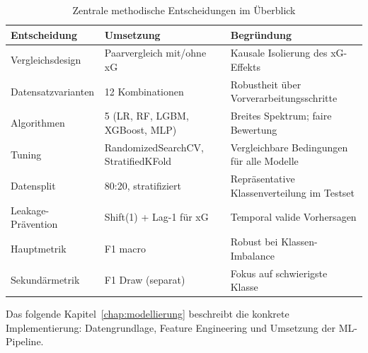 \begin{table}[h]
    \centering
    \caption{Zentrale methodische Entscheidungen im Überblick}
    \label{tab:methodik-entscheidungen}
    \begin{tabular}{p{3.5cm} p{3.8cm} p{4.7cm}}
        \toprule
        \textbf{Entscheidung} & \textbf{Umsetzung} & \textbf{Begründung} \\
        \midrule
        Vergleichsdesign   & Paarvergleich mit/ohne xG           & Kausale Isolierung des xG-Effekts \\
        Datensatzvarianten & 12 Kombinationen                    & Robustheit über Vorverarbeitungsschritte \\
        Algorithmen        & 5 (LR, RF, LGBM, XGBoost, MLP)     & Breites Spektrum; faire Bewertung \\
        Tuning             & RandomizedSearchCV, StratifiedKFold & Vergleichbare Bedingungen für alle Modelle \\
        Datensplit         & 80:20, stratifiziert                & Repräsentative Klassenverteilung im Testset \\
        Leakage-Prävention & Shift(1) + Lag-1 für xG             & Temporal valide Vorhersagen \\
        Hauptmetrik        & F1 macro                            & Robust bei Klassen-Imbalance \cite{Powers2020} \\
        Sekundärmetrik     & F1 Draw (separat)                   & Fokus auf schwierigste Klasse \\
        \bottomrule
    \end{tabular}
\end{table}

Das folgende Kapitel~\ref{chap:modellierung} beschreibt die konkrete
Implementierung: Datengrundlage, Feature Engineering und Umsetzung
der ML-Pipeline.